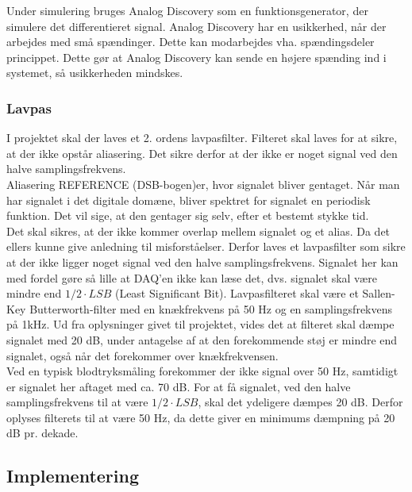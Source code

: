 Under simulering bruges Analog Discovery som en funktionsgenerator, der simulere det differentieret signal. Analog Discovery har en usikkerhed, når der arbejdes med små spændinger. Dette kan modarbejdes vha. spændingsdeler princippet. Dette gør at Analog Discovery kan sende en højere spænding ind i systemet, så usikkerheden mindskes.  

\subsubsection{Lavpas}
I projektet skal der laves et 2. ordens lavpasfilter. Filteret skal laves for at sikre, at der ikke opstår aliasering. Det sikre derfor at der ikke er noget signal ved den halve samplingsfrekvens.\\
Aliasering  REFERENCE (DSB-bogen)er, hvor signalet bliver gentaget. Når man har signalet i det digitale domæne, bliver spektret for signalet en periodisk funktion. Det vil sige, at den gentager sig selv, efter et bestemt stykke tid. \\
Det skal sikres, at der ikke kommer overlap mellem signalet og et alias. Da det ellers kunne give anledning til misforståelser. Derfor laves et lavpasfilter som sikre at der ikke ligger noget signal ved den halve samplingsfrekvens. Signalet her kan med fordel gøre så lille at DAQ'en ikke kan læse det, dvs. signalet skal være mindre end $ 1/2 \cdot LSB $ (Least Significant Bit).    
\newline  
Lavpasfilteret skal være et Sallen-Key Butterworth-filter med en knækfrekvens på 50 Hz og en samplingsfrekvens på 1kHz. Ud fra oplysninger givet til projektet, vides det at filteret skal dæmpe signalet med 20 dB, under antagelse af at den forekommende støj er mindre end signalet, også når det  forekommer over knækfrekvensen.\\
Ved en typisk blodtryksmåling forekommer der ikke signal over 50 Hz, samtidigt er signalet her aftaget med ca. 70 dB. For at få signalet, ved den halve samplingsfrekvens til at være $ 1/2 \cdot LSB $, skal det ydeligere dæmpes 20 dB. Derfor oplyses filterets til at være 50 Hz, da dette giver en minimums dæmpning på 20 dB pr. dekade.

\subsection{Implementering}
